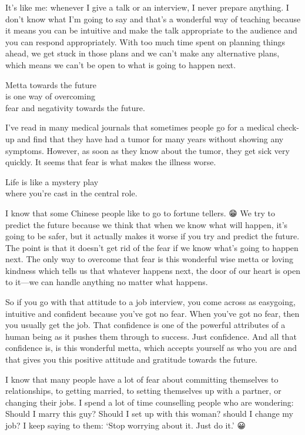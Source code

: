 \documentclass[12pt, openany]{book}
\newenvironment{aphorism}%
{%
\begin{center}\begin{itshape}
}%
{\end{itshape}\end{center}
}%
\begin{document}
It’s like me: whenever I give a talk or an interview, I never prepare anything. I don’t know what I’m going to say and that’s a wonderful way of teaching because it means you can be intuitive and make the talk appropriate to the audience and you can respond appropriately. With too much time spent on planning things ahead, we get stuck in those plans and we can’t make any alternative plans, which means we can’t be open to what is going to happen next. 

\begin{aphorism}
Metta towards the future\\  
is one way of overcoming\\ 
fear and negativity towards the future.
\end{aphorism}

I’ve read in many medical journals that sometimes people go for a medical check-up and find that they have had a tumor for many years without showing any symptoms. However, as soon as they know about the tumor, they get sick very quickly. It seems that fear is what makes the illness worse. 

\begin{aphorism}
Life is like a mystery play\\  
where you’re cast in the central role.
\end{aphorism}

I know that some Chinese people like to go to fortune tellers. 😁 We try to predict the future because we think that when we know what will happen, it’s going to be safer, but it actually makes it worse if you try and predict the future. The point is that it doesn’t get rid of the fear if we know what’s going to happen next. The only way to overcome that fear is this wonderful wise metta or loving kindness which tells us that whatever happens next, the door of our heart is open to it—we can handle anything no matter what happens. 

So if you go with that attitude to a job interview, you come across as easygoing, intuitive and confident because you’ve got no fear. When you’ve got no fear, then you usually get the job. That confidence is one of the powerful attributes of a human being as it pushes them through to success. Just confidence. And all that confidence is, is this wonderful metta, which accepts yourself as who you are and that gives you this positive attitude and gratitude towards the future. 

I know that many people have a lot of fear about committing themselves to relationships, to getting married, to setting themselves up with a partner, or changing their jobs. I spend a lot of time counselling people who are wondering: Should I marry this guy? Should I set up with this woman? should I change my job? I keep saying to them: ‘Stop worrying about it. Just do it.’ 😀 
\end{document}
